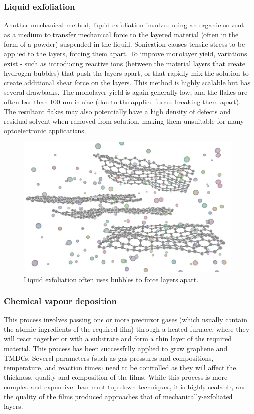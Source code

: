 \documentclass[12pt,a4paper]{report}
\begin{document}
\subsubsection{Liquid exfoliation}
Another mechanical method, liquid exfoliation involves using an organic solvent as a medium to transfer mechanical force to the layered material (often in the form of a powder) suspended in the liquid. Sonication causes tensile stress to be applied to the layers, forcing them apart. To improve monolayer yield, variations exist - such as introducing reactive ions (between the material layers that create hydrogen bubbles) that push the layers apart, or that rapidly mix the solution to create additional shear force on the layers.
This method is highly scalable but has several drawbacks. The monolayer yield is again generally low, and the flakes are often less than 100 nm in size (due to the applied forces breaking them apart). The resultant flakes may also potentially have a high density of defects and residual solvent when removed from solution, making them unsuitable for many optoelectronic applications.
\begin{figure}
  \centering
  \includegraphics[scale=0.3]{2.1.2.png}
  \caption{Liquid exfoliation often uses bubbles to force layers apart.}
  \label{liqexfol}
  \end{figure}

\subsubsection{Chemical vapour deposition}
This process involves passing one or more precursor gases (which usually contain the atomic ingredients of the required film) through a heated furnace, where they will react together or with a substrate and form a thin layer of the required material. This process has been successfully applied to grow graphene and TMDCs. Several parameters (such as gas pressures and compositions, temperature, and reaction times) need to be controlled as they will affect the thickness, quality and composition of the films. While this process is more complex and expensive than most top-down techniques, it is highly scalable, and the quality of the films produced approaches that of mechanically-exfoliated layers.
\end{document}
